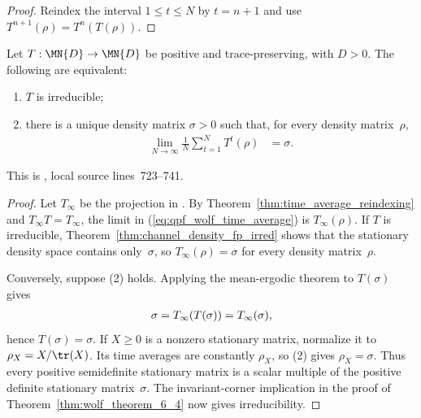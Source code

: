 \begin{proof}
    \leanok
    Reindex the interval $1\leq t\leq N$ by $t=n+1$ and use
    $T^{n+1}(\rho)=T^n(T(\rho))$.
\end{proof}

\begin{theorem}
    \label{thm:wolf_corollary_6_3}
    \leanok
    Let $T:\MN{D}\to\MN{D}$ be positive and trace-preserving, with $D>0$.
    The following are equivalent:
    \begin{enumerate}
        \item $T$ is irreducible;
        \item there is a unique density matrix $\sigma>0$ such that, for every
              density matrix~$\rho$,
              \begin{align}
                  \lim_{N\to\infty}\frac{1}{N}
                  \sum_{t=1}^{N}T^t(\rho)
                  &=\sigma.
                  \tag{6.35}\label{eq:qpf_wolf_time_average}
              \end{align}
    \end{enumerate}
    This is \cite[Corollary~6.3]{Wolf2012Quantum}, local source
    lines~723--741.
\end{theorem}

\begin{proof}
    \leanok
    Let $T_\infty$ be the projection in
    \cite[Equation~(6.14)]{Wolf2012Quantum}. By
    Theorem~\ref{thm:time_average_reindexing} and
    $T_\infty T=T_\infty$, the limit in
    (\ref{eq:qpf_wolf_time_average}) is $T_\infty(\rho)$. If $T$ is
    irreducible, Theorem~\ref{thm:channel_density_fp_irred} shows that the
    stationary density space contains only~$\sigma$, so
    $T_\infty(\rho)=\sigma$ for every density matrix~$\rho$.

    Conversely, suppose (2) holds. Applying the mean-ergodic theorem to
    $T(\sigma)$ gives
    \begin{align}
        \sigma=T_\infty(T(\sigma))=T_\infty(\sigma),
        \notag
    \end{align}
    hence $T(\sigma)=\sigma$. If $X\geq0$ is a nonzero stationary matrix,
    normalize it to $\rho_X=X/\tr(X)$. Its time averages are constantly
    $\rho_X$, so (2) gives $\rho_X=\sigma$. Thus every positive semidefinite
    stationary matrix is a scalar multiple of the positive definite
    stationary matrix~$\sigma$. The invariant-corner implication in the proof
    of Theorem~\ref{thm:wolf_theorem_6_4} now gives irreducibility.
\end{proof}


